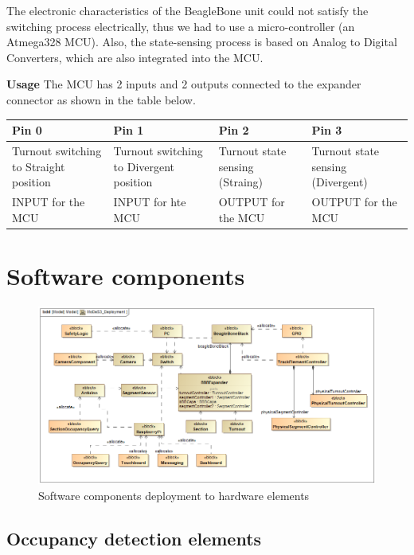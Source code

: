 The electronic characteristics of the BeagleBone unit could not satisfy the switching process electrically, thus we had to use a micro-controller (an Atmega328 MCU). Also, the state-sensing process is based on Analog to Digital Converters, which are also integrated into the MCU.

\textbf{Usage}
The MCU has 2 inputs and 2 outputs connected to the expander connector as shown in the table below.
\begin{center}
	\renewcommand{\arraystretch}{1.5}
	\begin{tabu} to 1.0\textwidth {X[c] X[c] X[c] X[c]}
		\toprule
		Pin 0                                  & Pin 1                                   & Pin 2                           & Pin 3                             \\ \midrule
		Turnout switching to Straight position & Turnout switching to Divergent position & Turnout state sensing (Straing) & Turnout state sensing (Divergent) \\
		INPUT for the MCU                      & INPUT for hte MCU                       & OUTPUT for the MCU              & OUTPUT for the MCU                \\ \bottomrule
	\end{tabu}
\end{center}


\section{Software components}

\begin{figure}[h]
	\centering
	\includegraphics[width=150mm]{figures/modes3/MoDeS3_Deployment1.png}
	\caption{Software components deployment to hardware elements}
	\label{fig:Modes3Deployment}
\end{figure}
\subsection{Occupancy detection elements} \label{section:OccupancyDetection}
